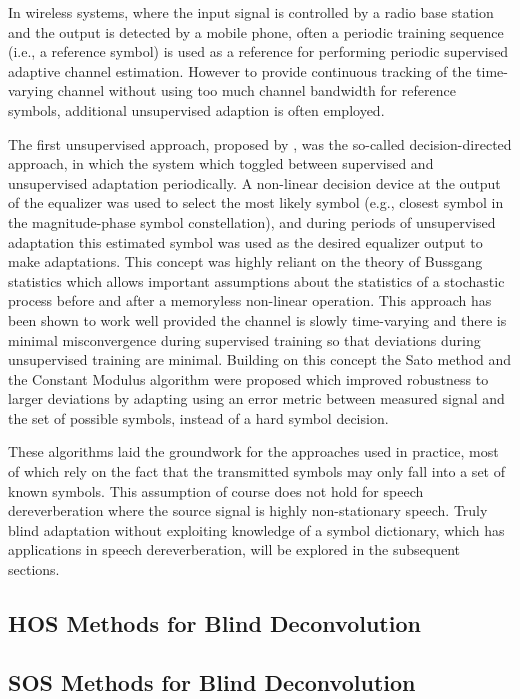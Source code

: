 In wireless systems, where the input signal is controlled by a radio base station and the output is detected by a mobile phone, often a periodic training sequence (i.e., a reference symbol) is used as a reference for performing periodic supervised adaptive channel estimation. However to provide continuous tracking of the time-varying channel without using too much channel bandwidth for reference symbols, additional unsupervised adaption is often employed.

The first unsupervised approach, proposed by \cite{lucky1965automatic}, was the so-called decision-directed approach, in which the system which toggled between supervised and unsupervised adaptation periodically. A non-linear decision device at the output of the equalizer was used to select the most likely symbol (e.g., closest symbol in the magnitude-phase symbol constellation), and during periods of unsupervised adaptation this estimated symbol was used as the desired equalizer output to make adaptations. This concept was highly reliant on the theory of Bussgang statistics which allows important assumptions about the statistics of a stochastic process before and after a memoryless non-linear operation. This approach has been shown to work well provided the channel is slowly time-varying and there is minimal misconvergence during supervised training so that deviations during unsupervised training are minimal. Building on this concept the Sato method \citep{sato1975method} and the Constant Modulus algorithm \citep{godard1980self} were proposed which improved robustness to larger deviations by adapting using an error metric between measured signal and the set of possible symbols, instead of a hard symbol decision. 

These algorithms laid the groundwork for the approaches used in practice, most of which rely on the fact that the transmitted symbols may only fall into a set of known symbols. This assumption of course does not hold for speech dereverberation where the source signal is highly non-stationary speech. Truly blind adaptation without exploiting knowledge of a symbol dictionary, which has applications in speech dereverberation, will be explored in the subsequent sections.

\subsection{HOS Methods for Blind Deconvolution}
\subsection{SOS Methods for Blind Deconvolution}

